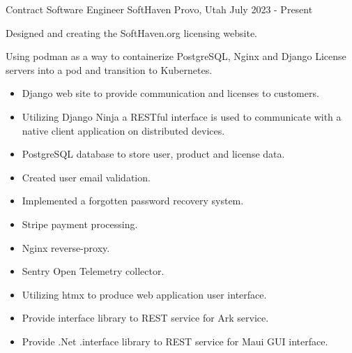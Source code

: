 \begin{cventries}
\cventry
{Contract Software Engineer} %
{SoftHaven} %
{Provo, Utah} %
{July 2023 - Present} %
{
	\begin{cvitems} %
		\item {Designed and creating the SoftHaven.org licensing website.}
		\item {Using podman as a way to containerize PostgreSQL, Nginx and Django License servers into a pod and transition to Kubernetes.}
		\begin{itemize}
			\item {Django web site to provide communication and licenses to customers.}
			\item {Utilizing Django Ninja a RESTful interface is used to communicate with a native client application on distributed devices.}
			\item {PostgreSQL database to store user, product and license data.}
			\item {Created user email validation.}
			\item {Implemented a forgotten password recovery system.}
			\item {Stripe payment processing.}
			\item {Nginx reverse-proxy.}
			\item {Sentry Open Telemetry collector.}
			\item {Utilizing htmx to produce web application user interface.}
			\item {Provide \Cpp interface library to REST service for Ark service.}
			\item {Provide .Net \Csh .interface library to REST service for Maui GUI interface.}
		\end{itemize}
	\end{cvitems}
}



\end{cventries}

